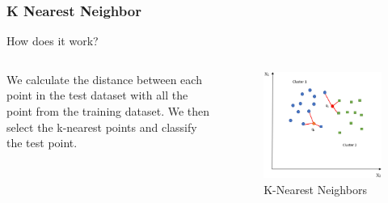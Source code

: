 \documentclass{beamer}
\begin{document}
\begin{frame}
\frametitle{K Nearest Neighbor}
\begin{center}
    How does it work?
\end{center}
\begin{columns}
    \begin{column}{0.5\textwidth}
        We calculate the distance between each point in the test dataset with all the point from
        the training dataset. We then select the k-nearest points and classify the test point.
    \end{column}

    \begin{column}{0.45\textwidth}
        \begin{figure}
            \centering
            \includegraphics[width=1\textwidth]{media/knn_example.png}
            \caption{K-Nearest Neighbors}
        \end{figure}
    \end{column}
\end{columns}
\end{frame}
\end{document}
